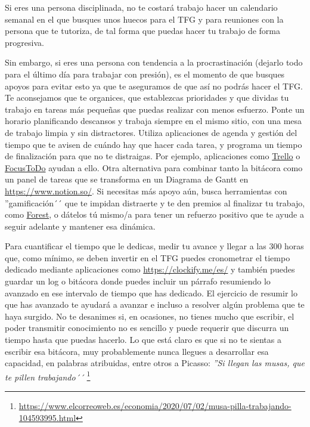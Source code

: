 Si eres una persona disciplinada, no te costará trabajo hacer un calendario semanal en el que busques unos huecos para el TFG y para reuniones con la persona que te tutoriza, de tal forma que puedas hacer tu trabajo de forma progresiva. 

Sin embargo, si eres una persona con tendencia a la procrastinación (dejarlo todo para el último día para trabajar con presión), es el momento de que busques apoyos para evitar esto ya que te aseguramos de que así no podrás hacer el TFG. Te aconsejamos que te organices, que establezcas prioridades y que dividas tu trabajo en tareas más pequeñas que puedas realizar con menos esfuerzo. Ponte un horario planificando descansos y trabaja siempre en el mismo sitio, con una mesa de trabajo limpia y sin distractores. Utiliza aplicaciones de agenda y gestión del tiempo que te avisen de cuándo hay que hacer cada tarea, y programa un tiempo de finalización para que no te distraigas. Por ejemplo, aplicaciones como \href{https://trello.com/}{Trello} o \href{https://www.focustodo.cn/}{FocusToDo} ayudan a ello. Otra alternativa para combinar tanto la bitácora como un panel de tareas que se transforma en un Diagrama de Gantt en \url{https://www.notion.so/}. Si necesitas más apoyo aún, busca herramientas con ''gamificación´´ que te impidan distraerte y te den premios al finalizar tu trabajo, como \href{https://www.forestapp.cc/}{Forest}, o dátelos tú mismo/a para tener un refuerzo positivo que te ayude a seguir adelante y mantener esa dinámica. 

Para cuantificar el tiempo que le dedicas, medir tu avance y llegar a las 300 horas que, como mínimo, se deben invertir en el TFG puedes cronometrar el tiempo dedicado mediante aplicaciones como \url{https://clockify.me/es/} y también puedes guardar un log o bitácora donde puedes incluir un párrafo resumiendo lo avanzado en ese intervalo de tiempo que has dedicado. El ejercicio de resumir lo que has avanzado te ayudará a avanzar e incluso a resolver algún problema que te haya surgido. No te desanimes si, en ocasiones, no tienes mucho que escribir, el poder transmitir conocimiento no es sencillo y puede requerir que discurra un tiempo hasta que puedas hacerlo. Lo que está claro es que si no te sientas a escribir esa bitácora, muy probablemente nunca llegues a desarrollar esa capacidad, en palabras atribuidas, entre otros a Picasso: {\it ''Si llegan las musas, que te pillen trabajando´´} \footnote{\url{https://www.elcorreoweb.es/economia/2020/07/02/musa-pilla-trabajando-104593995.html}}

